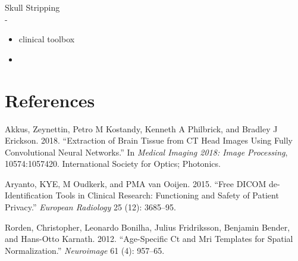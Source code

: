 \documentclass[]{elsarticle} %
\begin{document}
Skull Stripping\\
-

\begin{itemize}
\item
  clinical toolbox
\item
\end{itemize}

\hypertarget{references}{%
\section*{References}\label{references}}

\hypertarget{refs}{}
\leavevmode\hypertarget{ref-ct_bet}{}%
Akkus, Zeynettin, Petro M Kostandy, Kenneth A Philbrick, and Bradley J
Erickson. 2018. ``Extraction of Brain Tissue from CT Head Images Using
Fully Convolutional Neural Networks.'' In \emph{Medical Imaging 2018:
Image Processing}, 10574:1057420. International Society for Optics;
Photonics.

\leavevmode\hypertarget{ref-aryanto2015free}{}%
Aryanto, KYE, M Oudkerk, and PMA van Ooijen. 2015. ``Free DICOM
de-Identification Tools in Clinical Research: Functioning and Safety of
Patient Privacy.'' \emph{European Radiology} 25 (12): 3685--95.

\leavevmode\hypertarget{ref-rorden2012age}{}%
Rorden, Christopher, Leonardo Bonilha, Julius Fridriksson, Benjamin
Bender, and Hans-Otto Karnath. 2012. ``Age-Specific Ct and Mri Templates
for Spatial Normalization.'' \emph{Neuroimage} 61 (4): 957--65.
\end{document}
